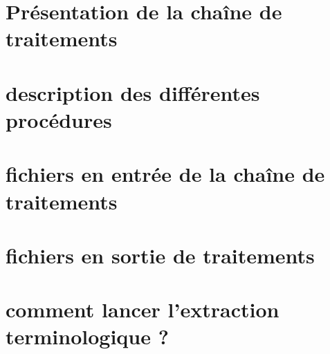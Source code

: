 \section{Présentation de la chaîne de traitements}
\section{description des différentes procédures}
\section{fichiers en entrée de la chaîne de traitements}
\section{fichiers en sortie de traitements}
\section{comment lancer l'extraction terminologique ?}
